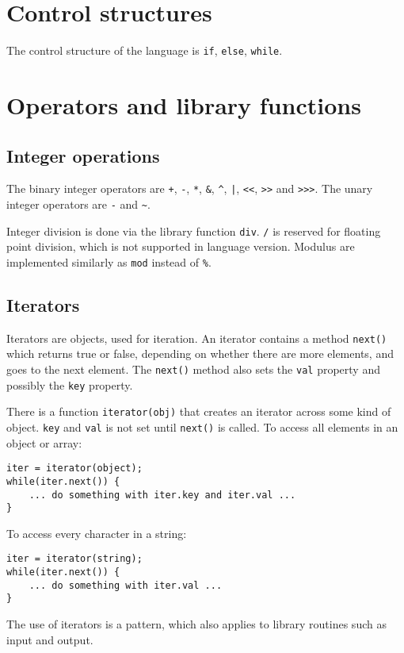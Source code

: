 \section{Control structures}

The control structure of the language is \verb|if|, \verb|else|, \verb|while|.

\section{Operators and library functions}

\subsection{Integer operations}

The binary integer operators are
\verb|+|, \verb|-|, \verb|*|, \verb|&|, \verb|^|, \verb$|$, \verb|<<|, \verb|>>| and \verb|>>>|.
The unary integer operators are \verb|-| and \verb|~|.

Integer division is done via the library function \verb|div|. \verb|/| is reserved for floating point division, which is not supported in language version.
Modulus are implemented similarly as \verb|mod| instead of \verb|%|.


\subsection{Iterators}
Iterators are objects, used for iteration. An iterator contains a method \verb|next()| which returns true or false, depending on whether there are more elements, and goes to the next element. The \verb|next()| method also sets the \verb|val| property and possibly the \verb|key| property.

There is a function \verb|iterator(obj)| that creates an iterator across some kind of object. \verb|key| and \verb|val| is not set until \verb|next()| is called. To access all elements in an object or array:
\begin{verbatim}
iter = iterator(object);
while(iter.next()) {
    ... do something with iter.key and iter.val ...
}
\end{verbatim}
To access every character in a string:
\begin{verbatim}
iter = iterator(string);
while(iter.next()) {
    ... do something with iter.val ...
}
\end{verbatim}

The use of iterators is a pattern, which also applies to library routines such as input and output.


